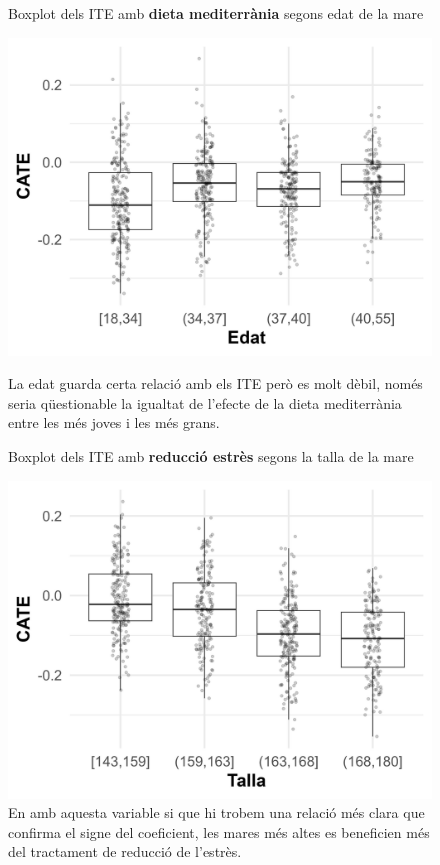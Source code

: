 \documentclass[../main.tex]{subfiles}
\begin{document}
    \begin{figure}[!htb]
      \centering
      \begin{minipage}[t]{0.48\textwidth}
        \captionsetup{font=small}
        \caption*{\centering Boxplot dels ITE amb \textbf{dieta mediterrània} segons edat de la mare}
        \includegraphics[width=\textwidth]{imgs/boxplots/boxplot_edad_2_SGA.jpg}
        \captionsetup{font=footnotesize}
        \caption{La edat guarda certa relació amb els ITE però es molt dèbil, només seria qüestionable la igualtat de l'efecte de la dieta mediterrània entre les més joves i les més grans.}
        \label{boxplot:edat_SGA2}
      \end{minipage}
      \hspace{0.01\textwidth}
      \begin{minipage}[t]{0.48\textwidth}
        \captionsetup{font=small}
        \caption*{\centering Boxplot dels ITE amb \textbf{reducció estrès} segons la talla de la mare}
        \includegraphics[width=\textwidth]{imgs/boxplots/boxplot_talla_3_SGA.jpg}
        \captionsetup{font=footnotesize}
        \caption{En amb aquesta variable si que hi trobem una relació més clara que confirma el signe del coeficient, les mares més altes es beneficien més del tractament de reducció de l'estrès.}
        \label{boxplot:talla_SGA3}
      \end{minipage}
    \end{figure}
\end{document}
